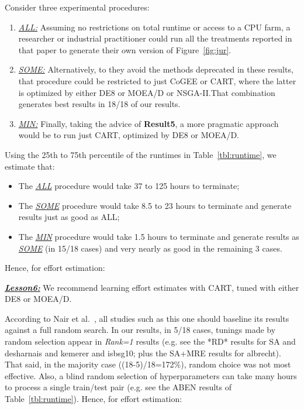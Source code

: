 \documentclass[10pt,conference]{IEEEtran}
\newcommand{\bi}{\begin{itemize}}
\newcommand{\ei}{\end{itemize}}
\newcommand{\be}{\begin{enumerate}}
\newcommand{\ee}{\end{enumerate}}
\newenvironment{result}[2]
{\begin{myshadowbox}\textbf{\textit{\underline{Lesson#1:}}} #2}{ 
\end{myshadowbox}}
\begin{document}
Consider three experimental procedures:
\be
\item
\underline{{\em ALL:}} Assuming no restrictions on total runtime or access to a CPU farm, a researcher
or industrial practitioner could run all the treatments reported in that paper
to generate their own version of Figure~\ref{fig:jur}. 
\item
\underline{{\em SOME:}} Alternatively, to they avoid the methods deprecated in these results,
that procedure could be restricted
to just  CoGEE or  CART, where the latter is optimized by either DE8 or MOEA/D or NSGA-II.That combination generates best results in 18/18 of our results.
\item \underline{{\em MIN:}} 
Finally, taking the advice of {\bf Result5}, a more pragmatic approach would be to run just CART, optimized by DE8 or MOEA/D.
\ee
Using the 25th to 75th percentile of the runtimes in   Table~\ref{tbl:runtime}, we estimate that:
\bi
\item
The \underline{{\em ALL}} procedure would take 37 to   125 hours to terminate;
\item
The \underline{{\em SOME}} procedure would take 8.5 to 23 hours to terminate and generate results
just as good as ALL;
\item
The \underline{{\em MIN}}  procedure would take 1.5 hours to terminate and generate results
as \underline{{\em SOME}}  (in 15/18 cases) and very nearly as good in the remaining 3 cases.
\ei
Hence, for effort estimation:
  \begin{result}{6}
   We recommend learning effort estimates with CART, tuned with either
   DE8 or MOEA/D.
 \end{result}








According to Nair et al.~\cite{nair18},
all studies such as this one should baseline its
results against a full random search. In our results,
in 5/18 cases, tunings made by
  random selection  appear in {\em Rank=1} results
  (e.g. see the *RD* results for SA and desharnais and kemerer and isbsg10; plus the   SA+MRE results
  for albrecht).
  That said, in the majority case ((18-5)/18=172\%), random choice was not most effective. Also, a blind random selection of hyperparameters can take many hours to process a single train/test pair (e.g. see the ABEN results of Table~\ref{tbl:runtime}). Hence, for effort estimation:
  
\end{document}
